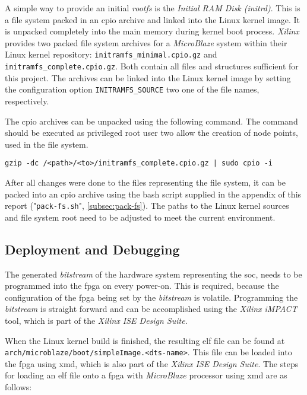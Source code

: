 A simple way to provide an initial \textit{rootfs} is the \textit{Initial RAM Disk (initrd)}. This is a file system packed in an cpio archive and linked into the Linux kernel image. It is unpacked completely into the main memory during kernel boot process. \textit{Xilinx} provides two packed file system archives for a \textit{MicroBlaze} system within their Linux kernel repository: \texttt{initramfs\_minimal.cpio.gz} and \texttt{initramfs\_complete.cpio.gz}. Both contain all files and structures sufficient for this project. The archives can be linked into the Linux kernel image by setting the configuration option \texttt{INITRAMFS\_SOURCE} two one of the file names, respectively.

The cpio archives can be unpacked using the following command. The command should be executed as privileged root user two allow the creation of node points, used in the file system.

\begin{verbatim}
gzip -dc /<path>/<to>/initramfs_complete.cpio.gz | sudo cpio -i
\end{verbatim}

After all changes were done to the files representing the file system, it can be packed into an cpio archive using the bash script supplied in the appendix of this report ("\texttt{pack-fs.sh}", \ref{subsec:pack-fs}). The paths to the Linux kernel sources and file system root need to be adjusted to meet the current environment.


\subsection{Deployment and Debugging}

The generated \textit{bitstream} of the hardware system representing the \gls{soc}, needs to be programmed into the \gls{fpga} on every power-on. This is required, because the configuration of the \gls{fpga} being set by the \textit{bitstream} is volatile. Programming the \textit{bitstream} is straight forward and can be accomplished using the \textit{Xilinx iMPACT} tool, which is part of the \textit{Xilinx ISE Design Suite}.

When the Linux kernel build is finished, the resulting \gls{elf} file can be found at \texttt{arch/microblaze/boot/simpleImage.<dts-name>}. This file can be loaded into the \gls{fpga} using \gls{xmd}, which is also part of the \textit{Xilinx ISE Design Suite}. The steps for loading an \gls{elf} file onto a \gls{fpga} with \textit{MicroBlaze} processor using \gls{xmd} are as follows:

